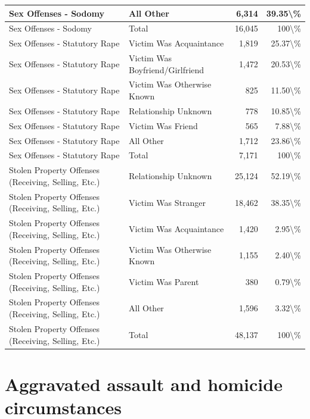 \documentclass[
]{krantz}
\begin{document}
\begin{longtable}[t]{l|l|r|r}
\hline
Sex Offenses - Sodomy & All Other & 6,314 & 39.35\textbackslash{}\%\\
\hline
Sex Offenses - Sodomy & Total & 16,045 & 100\textbackslash{}\%\\
\hline
Sex Offenses - Statutory Rape & Victim Was Acquaintance & 1,819 & 25.37\textbackslash{}\%\\
\hline
Sex Offenses - Statutory Rape & Victim Was Boyfriend/Girlfriend & 1,472 & 20.53\textbackslash{}\%\\
\hline
Sex Offenses - Statutory Rape & Victim Was Otherwise Known & 825 & 11.50\textbackslash{}\%\\
\hline
Sex Offenses - Statutory Rape & Relationship Unknown & 778 & 10.85\textbackslash{}\%\\
\hline
Sex Offenses - Statutory Rape & Victim Was Friend & 565 & 7.88\textbackslash{}\%\\
\hline
Sex Offenses - Statutory Rape & All Other & 1,712 & 23.86\textbackslash{}\%\\
\hline
Sex Offenses - Statutory Rape & Total & 7,171 & 100\textbackslash{}\%\\
\hline
Stolen Property Offenses (Receiving, Selling, Etc.) & Relationship Unknown & 25,124 & 52.19\textbackslash{}\%\\
\hline
Stolen Property Offenses (Receiving, Selling, Etc.) & Victim Was Stranger & 18,462 & 38.35\textbackslash{}\%\\
\hline
Stolen Property Offenses (Receiving, Selling, Etc.) & Victim Was Acquaintance & 1,420 & 2.95\textbackslash{}\%\\
\hline
Stolen Property Offenses (Receiving, Selling, Etc.) & Victim Was Otherwise Known & 1,155 & 2.40\textbackslash{}\%\\
\hline
Stolen Property Offenses (Receiving, Selling, Etc.) & Victim Was Parent & 380 & 0.79\textbackslash{}\%\\
\hline
Stolen Property Offenses (Receiving, Selling, Etc.) & All Other & 1,596 & 3.32\textbackslash{}\%\\
\hline
Stolen Property Offenses (Receiving, Selling, Etc.) & Total & 48,137 & 100\textbackslash{}\%\\
\hline
\end{longtable}

\section{Aggravated assault and homicide
circumstances}\label{aggravated-assault-and-homicide-circumstances}
\end{document}
